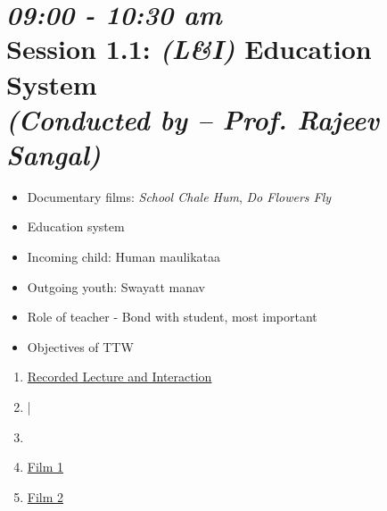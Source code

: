 \documentclass[11pt]{article}
\begin{document}


    \section*{{\it 09:00 - 10:30 am} \\
    Session 1.1: {\it (L\&I)} {\bf Education System } \\
    {\large\it(Conducted by -- Prof. Rajeev Sangal)}}

    \begin{itemize}
        \item Documentary films:
            {\em School Chale Hum},
            {\em Do Flowers Fly}
        \item Education system
        \item Incoming child: Human maulikataa
        \item Outgoing youth: Swayatt manav
        \item Role of teacher - Bond with student, most important
        \item Objectives of TTW
    \end{itemize}

    \begin{enumerate}
        \item \href{https://www.youtube.com/watch?v=uQJyFCRKvw0}{Recorded Lecture and Interaction}
        \item |
        \item \item \href{https://www.youtube.com/watch?v=lpc-jGZkbAk}{Film 1}
        \item \href{https://www.youtube.com/watch?v=8fw-Ae3muR8}{Film 2}
    \end{enumerate}
\end{document}
